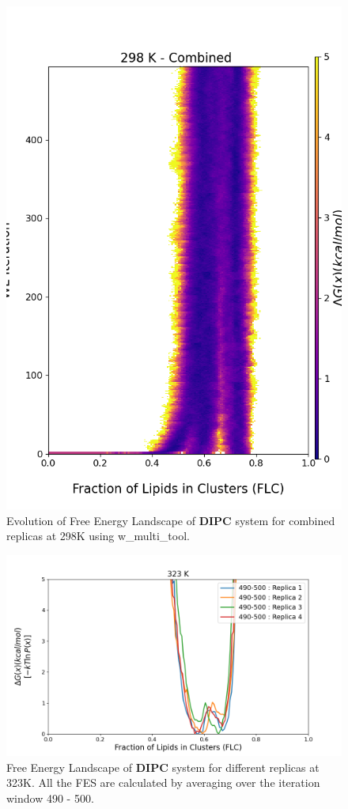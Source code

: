\documentclass{biophys-new}
\begin{document}
\begin{figure}[hbt!]
\centering
\includegraphics[width=0.8\linewidth]{all_plots/ClusterLipids2Total/DPPC_DIPC_CHOL/298K/Evolution_DIPC_MULTI__298_ClusterLipids2Total.png}
\caption{Evolution of Free Energy Landscape of \textbf{DIPC} system for combined replicas at 298K using w\_multi\_tool.}
\label{fig:view}

\end{figure}


\begin{figure}[hbt!]
\centering
\includegraphics[width=1.1\linewidth]{all_plots/ClusterLipids2Total/DPPC_DIPC_CHOL/323K/Average_DIPC_323_ClusterLipids2Total.png}
\caption{Free Energy Landscape of \textbf{DIPC} system for different replicas at 323K. All the FES are calculated by averaging over the iteration window 490 - 500.}
\label{fig:view}

\end{figure}
\end{document}
